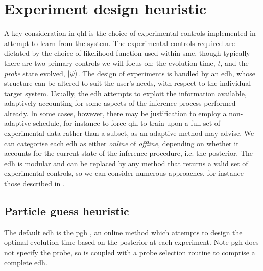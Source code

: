 \section{Experiment design heuristic}\label{sec:heuristic}
A key consideration in \gls{qhl} is the choice of experimental controls implemented in attempt to learn from the system. 
The experimental controls required are dictated by the choice of  \gls{likelihood} function used within \gls{smc}, 
    though typically there are two primary controls we will focus on: 
    the evolution time, $t$, and the \emph{\gls{probe}} state evolved, $\ket{\psi}$. 
The design of experiments is handled by an \gls{edh}, 
    whose structure can be altered to suit the user's needs, with respect to the individual target system. 
Usually, the \gls{edh} attempts to exploit the information available, 
    adaptively accounting for some aspects of the inference process performed already. 
In some cases, however, there may be justification to employ a non-adaptive schedule, 
    for instance to force \gls{qhl} to train upon a full set of experimental data rather than a subset,
    as an adaptive method may advise.
We can categorise each \gls{edh} as either \emph{online} of \emph{offline},
    depending on whether it accounts for the current state of the inference procedure, i.e. the posterior.
The \gls{edh} is modular and can be replaced by any method that returns a valid set of experimental controls, 
    so we can consider numerous approaches, for instance those described in \cite{hincks2018hamiltonian, fiderer2020neural}.
\par 

\subsection{Particle guess heuristic}\label{sec:pgh}
The default \gls{edh} is the \gls{pgh} \cite{Wiebe:2014qhl}, 
    an online method which attempts to design the optimal evolution time based on the posterior at each experiment.
Note \gls{pgh} does not specify the \gls{probe}, so is coupled with a \gls{probe} selection routine to comprise 
    a complete \gls{edh}.
\par

